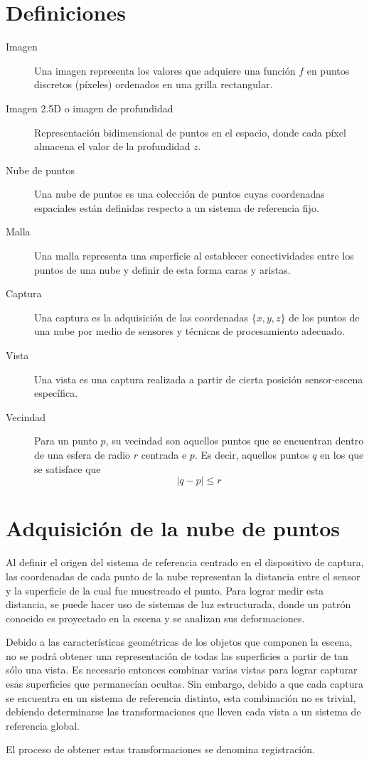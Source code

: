 \section{Definiciones}
\begin{description}
	\item [Imagen]
		Una imagen representa los valores que adquiere una función $f$
		en puntos discretos (píxeles) ordenados en una grilla rectangular.
	\item [Imagen 2.5D o imagen de profundidad]
		Representación bidimensional de puntos en el espacio, donde cada píxel
		almacena el valor de la profundidad $z$.
	\item [Nube de puntos]
		Una nube de puntos es una colección de puntos cuyas coordenadas espaciales
		están definidas respecto a un sistema de referencia fijo.
	\item [Malla]
		Una malla representa una superficie al establecer conectividades entre
		los puntos de una nube y definir de esta forma caras y aristas.
	\item [Captura]
		Una captura es la adquisición de las coordenadas $\{x, y, z\}$ de los puntos de una nube
		por medio de sensores y técnicas de procesamiento adecuado.
	\item [Vista]
		Una vista es una captura realizada a partir de cierta posición sensor-escena específica.
	\item [Vecindad]
		Para un punto $p$, su vecindad son aquellos puntos que se encuentran
		dentro de una esfera de radio $r$ centrada e $p$. Es decir, aquellos
		puntos $q$ en los que se satisface que
		\[ |q - p| \leq r \]
\end{description}

\section{Adquisición de la nube de puntos}
Al definir el origen del sistema de referencia centrado en el dispositivo de captura,
las coordenadas de cada punto de la nube representan la distancia entre el sensor y la superficie
de la cual fue muestreado el punto.
Para lograr medir esta distancia, se puede hacer uso de sistemas de luz estructurada,
donde un patrón conocido es proyectado en la escena y se analizan sus deformaciones.

Debido a las características geométricas de los objetos que componen la escena,
no se podrá obtener una representación de todas las superficies a partir de tan sólo
una vista. Es necesario entonces combinar varias vistas para lograr capturar
esas superficies que permanecían ocultas. Sin embargo, debido a que
cada captura se encuentra en un sistema de referencia distinto,
esta combinación no es trivial, debiendo determinarse las transformaciones que lleven
cada vista a un sistema de referencia global.

El proceso de obtener estas transformaciones se denomina registración.
